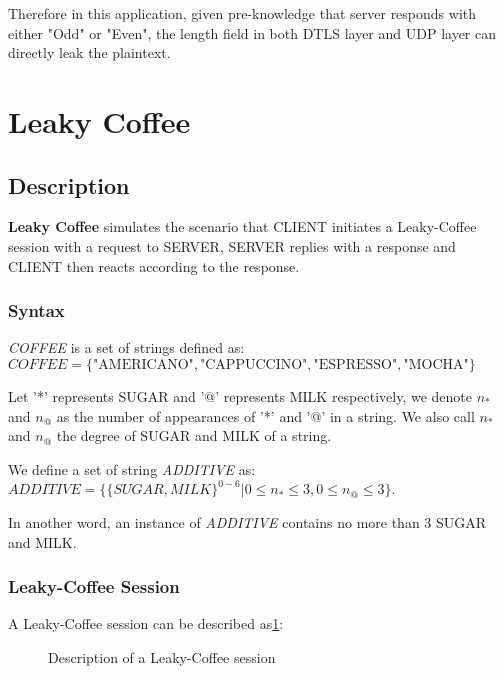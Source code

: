 Therefore in this application, given pre-knowledge that server responds with either "Odd" or "Even", the length field in both DTLS layer and UDP layer can directly leak the plaintext. 

\section{Leaky Coffee}

\subsection{Description}
\textbf{Leaky Coffee} simulates the scenario that CLIENT initiates a Leaky-Coffee session with a request to SERVER, SERVER replies with a response and CLIENT then reacts according to the response.

\subsubsection{Syntax}
\begin{definition}
\textit{COFFEE} is a set of strings defined as:\\
 $COFFEE = \{  {\text{"AMERICANO"}}, \text{"CAPPUCCINO"}, \text{"ESPRESSO"}, \text{"MOCHA"}\}$
\end{definition}

\begin{definition}
Let '*' represents SUGAR and '@' represents MILK respectively, we denote $n_*$ and $n_@$ as the number of appearances of '*' and '@' in a string. We also call $n_*$ and $n_@$ the degree of SUGAR and MILK of a string.
\end{definition}

\begin{definition}
We define a set of string \textit{ADDITIVE} as:\\
$ADDITIVE = \{\{ SUGAR, MILK \}^{0 - 6} | 0 \leq n_{*} \leq 3, 0 \leq n_{@} \leq 3 \}$.

In another word, an instance of \textit{ADDITIVE} contains no more than 3 SUGAR and MILK.
\end{definition}

\subsubsection{Leaky-Coffee Session}
A Leaky-Coffee session can be described as\ref{Fig: Leaky-Coffee Session}:

\begin{figure}[H] \label{Fig: Leaky-Coffee Session}
\caption{Description of a Leaky-Coffee session}
\centering
\resizebox{14cm}{!}
{}
\end{figure}

